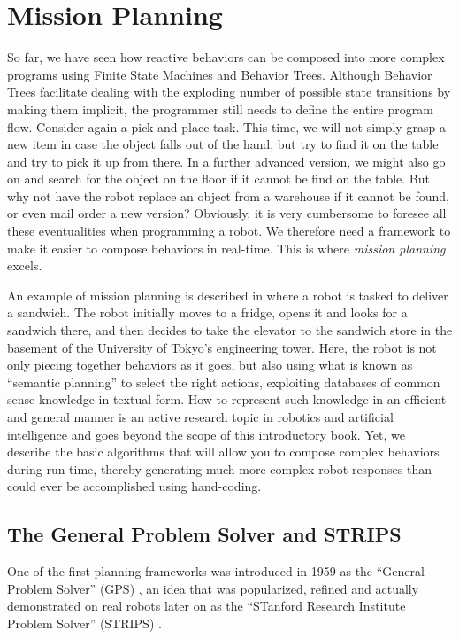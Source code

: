 \section{Mission Planning}\label{sec:strips}
So far, we have seen how reactive behaviors can be composed into more complex programs using Finite State Machines and Behavior Trees. Although Behavior Trees facilitate dealing with the exploding number of possible state transitions by making them implicit, the programmer still needs to define the entire program flow. Consider again a pick-and-place task. This time, we will not simply grasp a new item in case the object falls out of the hand, but try to find it on the table and try to pick it up from there. In a further advanced version, we might also go on and search for the object on the floor if it cannot be find on the table. But why not have the robot replace an object from a warehouse if it cannot be found, or even mail order a new version? Obviously, it is very cumbersome to foresee all these eventualities when programming a robot. We therefore need a framework to make it easier to compose behaviors in real-time. This is where \textsl{mission planning} excels.

An example of mission planning is described in \cite{saito2011semantic} where a robot is tasked to deliver a sandwich. The robot initially moves to a fridge, opens it and looks for a sandwich there, and then decides to take the elevator to the sandwich store in the basement of the University of Tokyo's engineering tower. Here, the robot is not only piecing together behaviors as it goes, but also using what is known as ``semantic planning'' to select the right actions, exploiting databases of common sense knowledge in textual form. How to represent such knowledge in an efficient and general manner is an active research topic in robotics and artificial intelligence and goes beyond the scope of this introductory book. Yet, we describe the basic algorithms that will allow you to compose complex behaviors during run-time, thereby generating much more complex robot responses than could ever be accomplished using hand-coding.

\subsection{The General Problem Solver and STRIPS}
One of the first planning frameworks was introduced in 1959 as the ``General Problem Solver'' (GPS) \cite{newell1959report}, an idea that was popularized, refined and actually demonstrated on real robots later on as the ``STanford Research Institute Problem Solver'' (STRIPS) \cite{fikes1971strips}.

